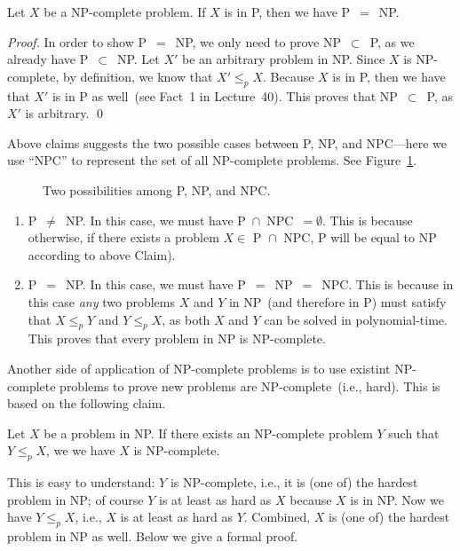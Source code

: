 \begin{claim}
Let $X$ be a NP-complete problem. If $X$ is in P, then we have P{}~$=${}~NP.
\end{claim}

\emph{Proof.} 	
In order to show P{}~$=${}~NP, we only need to prove NP{}~$\subset${}~P, as we already have P{}~$\subset${}~NP. 
Let $X'$ be an arbitrary problem in NP.  
Since $X$ is NP-complete, by definition, we know that $X'\le_p X$. Because
$X$ is in P, then we have that $X'$ is in P as well~(see Fact~1 in Lecture~40).
This proves that NP{}~$\subset${}~P, as $X'$ is arbitrary.  \qed

Above claims suggests the two possible cases between P, NP, and NPC---here we use ``NPC''
to represent the set of all NP-complete problems. See Figure~\ref{fig:PvsNP}.

\begin{figure}[!h]
\centering{}
\caption{Two possibilities among P, NP, and NPC.}
\label{fig:PvsNP}
\end{figure}

\vspace*{-\topsep}
\begin{enumerate}
\item P{}~$\neq${}~NP. In this case, we must have P{}~$\cap${}~NPC{}~$=\emptyset$. This is
because otherwise, if there exists a problem $X\in \textrm{ P } \cap \textrm{ NPC}$, P will be equal to NP according to above Claim). 
\item P{}~$=${}~NP. In this case, we must have P{}~$=${}~NP{}~$=${}~NPC. 
This is because in this case \emph{any} two problems $X$ and $Y$ in NP~(and therefore in P)
must satisfy that $X\le_p Y$ and $Y\le_p X$, as both $X$ and $Y$ can be solved in polynomial-time.
This proves that every problem in NP is NP-complete.
\end{enumerate}

Another side of application of NP-complete problems is to use existint NP-complete problems
to prove new problems are NP-complete~(i.e., hard). This is based on the following claim.

\begin{claim}
Let $X$ be a problem in NP. If there exists an NP-complete problem $Y$ such that $Y\le_p X$,
we we have $X$ is NP-complete.
\end{claim}

This is easy to understand: $Y$ is NP-complete, i.e., it is (one of) the hardest problem
in NP; of course $Y$ is at least as hard as $X$ because $X$ is in NP.
Now we have $Y\le_p X$, i.e., $X$ is at least as hard as $Y$. Combined, $X$ is (one of) the
hardest problem in NP as well. Below we give a formal proof.

